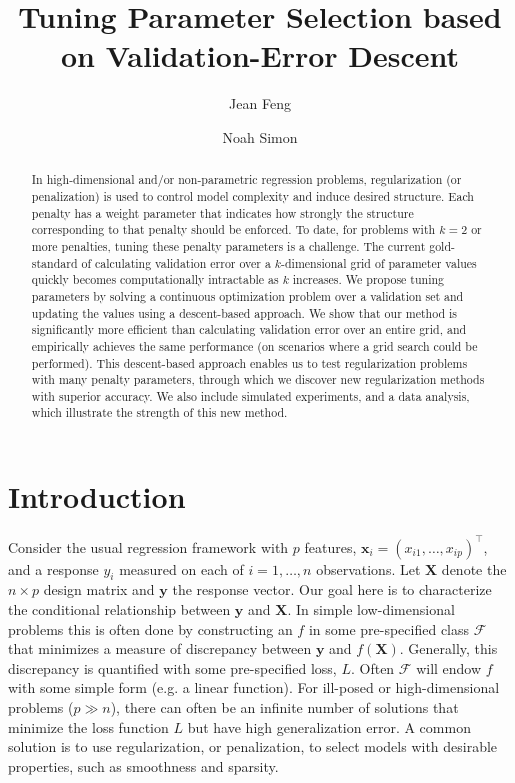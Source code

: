 \documentclass{statsoc}
\title[Tuning Parameter Selection]{Tuning Parameter Selection based on Validation-Error Descent}
\author[Feng and Simon]{Jean Feng}
\author[Feng and Simon]{Noah Simon}
\begin{document}
\begin{abstract}
In high-dimensional and/or non-parametric regression problems, regularization (or penalization) is used to control model complexity and induce desired structure. Each penalty has a weight parameter that indicates how strongly the structure corresponding to that penalty should be enforced. To date, for problems with $k=2$ or more penalties, tuning these penalty parameters is a challenge. The current gold-standard of calculating validation error over a $k$-dimensional grid of parameter values quickly becomes computationally intractable as $k$ increases. We propose tuning parameters by solving a continuous optimization problem over a validation set and updating the values using a descent-based approach. We show that our method is significantly more efficient than calculating validation error over an entire grid, and empirically achieves the same performance (on scenarios where a grid search could be performed). This descent-based approach enables us to test regularization problems with many penalty parameters, through which we discover new regularization methods with superior accuracy. We also include simulated experiments, and a data analysis, which illustrate the strength of this new method.
\end{abstract}


\section{Introduction}
Consider the usual regression framework with $p$ features, $\boldsymbol x_i = (x_{i1},\ldots,x_{ip})^\top$, and a response $y_i$ measured on each of $i=1,\ldots,n$ observations. Let $\boldsymbol X$ denote the $n \times p$ design matrix and $\boldsymbol y$ the response vector. Our goal here is to characterize the conditional relationship between $\boldsymbol y$ and $\boldsymbol X$. In simple low-dimensional problems this is often done by constructing an $f$ in some pre-specified class $\mathcal{F}$ that minimizes a measure of discrepancy between $\boldsymbol y$ and $f(\boldsymbol X)$. Generally, this discrepancy is quantified with some pre-specified loss, $L$. Often $\mathcal{F}$ will endow $f$ with some simple form (e.g. a linear function). For ill-posed or high-dimensional problems ($p \gg n$), there can often be an infinite number of solutions that minimize the loss function $L$ but have high generalization error. A common solution is to use regularization, or penalization, to select models with desirable properties, such as smoothness and sparsity.
\end{document}
